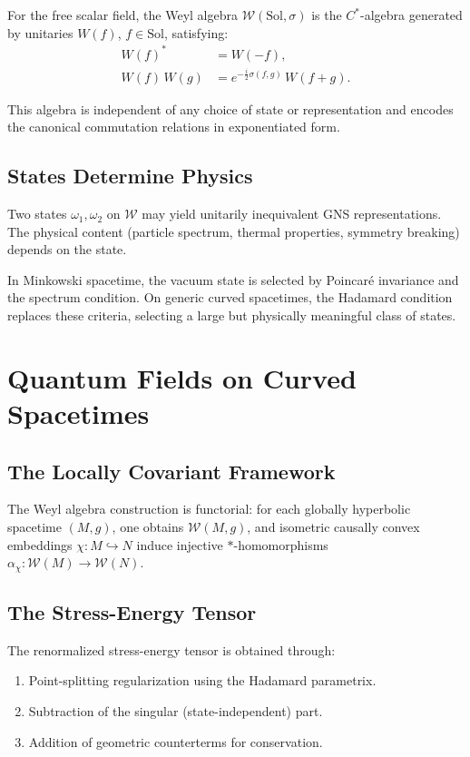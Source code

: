\documentclass[11pt,a4paper]{article}
\begin{document}
For the free scalar field, the Weyl algebra $\mathcal{W}(\mathrm{Sol}, \sigma)$
is the $C^*$-algebra generated by unitaries $W(f)$, $f \in \mathrm{Sol}$,
satisfying:
\begin{align}
  W(f)^* &= W(-f), \\
  W(f)\, W(g) &= e^{-\frac{i}{2}\sigma(f,g)}\, W(f+g).
\end{align}

This algebra is independent of any choice of state or representation
and encodes the canonical commutation relations in exponentiated form.

\subsection{States Determine Physics}

Two states $\omega_1, \omega_2$ on $\mathcal{W}$ may yield unitarily
inequivalent GNS representations. The physical content (particle spectrum,
thermal properties, symmetry breaking) depends on the state.

In Minkowski spacetime, the vacuum state is selected by Poincar\'e invariance
and the spectrum condition. On generic curved spacetimes, the Hadamard
condition replaces these criteria, selecting a large but physically
meaningful class of states.

\section{Quantum Fields on Curved Spacetimes}

\subsection{The Locally Covariant Framework}

The Weyl algebra construction is functorial: for each globally hyperbolic
spacetime $(M, g)$, one obtains $\mathcal{W}(M, g)$, and isometric
causally convex embeddings $\chi: M \hookrightarrow N$ induce injective
$*$-homomorphisms $\alpha_\chi: \mathcal{W}(M) \to \mathcal{W}(N)$.

\subsection{The Stress-Energy Tensor}

The renormalized stress-energy tensor is obtained through:
\begin{enumerate}[nosep]
  \item Point-splitting regularization using the Hadamard parametrix.
  \item Subtraction of the singular (state-independent) part.
  \item Addition of geometric counterterms for conservation.
\end{enumerate}
\end{document}
